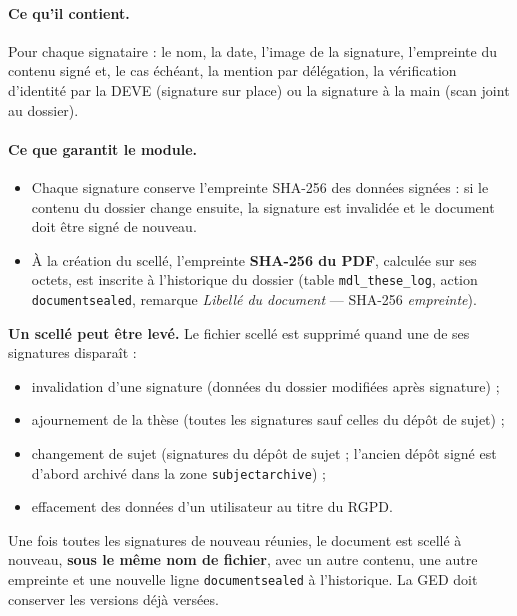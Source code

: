 \documentclass[11pt,a4paper]{article}
\begin{document}
\paragraph{Ce qu'il contient.} Pour chaque signataire : le nom, la date, l'image de la signature,
l'empreinte du contenu signé et, le cas échéant, la mention \og par délégation\fg{}, la vérification
d'identité par la DEVE (signature sur place) ou la signature à la main (scan joint au dossier).

\paragraph{Ce que garantit le module.}
\begin{itemize}
  \item Chaque signature conserve l'empreinte SHA-256 des données signées : si le contenu du dossier
        change ensuite, la signature est invalidée et le document doit être signé de nouveau.
  \item À la création du scellé, l'empreinte \textbf{SHA-256 du PDF}, calculée sur ses octets, est
        inscrite à l'historique du dossier (table \texttt{mdl\_these\_log}, action
        \texttt{documentsealed}, remarque \og \textit{Libellé du document} — SHA-256
        \textit{empreinte}\fg{}).
\end{itemize}

\begin{attention}
\textbf{Un scellé peut être levé.} Le fichier scellé est supprimé quand une de ses signatures disparaît :
\begin{itemize}
  \item invalidation d'une signature (données du dossier modifiées après signature) ;
  \item ajournement de la thèse (toutes les signatures sauf celles du dépôt de sujet) ;
  \item changement de sujet (signatures du dépôt de sujet ; l'ancien dépôt signé est d'abord archivé
        dans la zone \texttt{subjectarchive}) ;
  \item effacement des données d'un utilisateur au titre du RGPD.
\end{itemize}
Une fois toutes les signatures de nouveau réunies, le document est scellé à nouveau, \textbf{sous le
même nom de fichier}, avec un autre contenu, une autre empreinte et une nouvelle ligne
\texttt{documentsealed} à l'historique. La GED doit conserver les versions déjà versées.
\end{attention}
\end{document}
